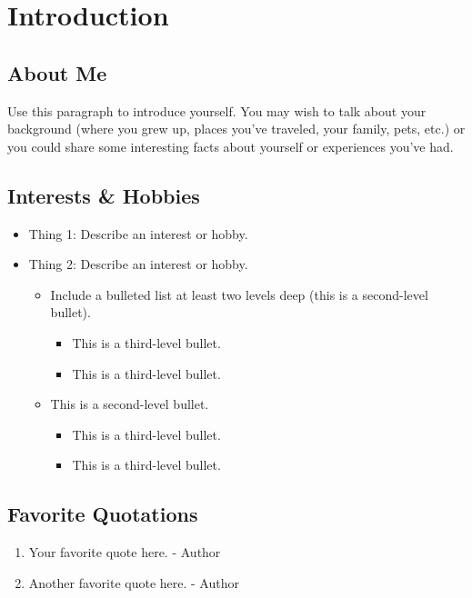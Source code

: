 \documentclass[a4paper,15pt]{article}
\begin{document}
\section{Introduction}

\subsection{About Me}
Use this paragraph to introduce yourself. You may wish to talk about your background (where you grew up, places you’ve traveled, your family, pets, etc.) or you could share some interesting facts about yourself or experiences you’ve had.

\subsection{Interests \& Hobbies}
\begin{itemize}
    \item Thing 1: Describe an interest or hobby.
    \item Thing 2: Describe an interest or hobby.
    \begin{itemize}
        \item Include a bulleted list at least two levels deep (this is a second-level bullet).
        \begin{itemize}
            \item This is a third-level bullet.
            \item This is a third-level bullet.
        \end{itemize}
        \item This is a second-level bullet.
        \begin{itemize}
            \item This is a third-level bullet.
            \item This is a third-level bullet.
        \end{itemize}
    \end{itemize}
\end{itemize}

\subsection{Favorite Quotations}
\begin{enumerate}
    \item Your favorite quote here. - Author
    \item Another favorite quote here. - Author
\end{enumerate}
\end{document}
